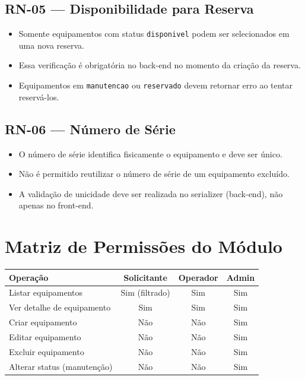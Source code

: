 \documentclass[12pt,a4paper]{article}
\begin{document}
\subsection{RN-05 — Disponibilidade para Reserva}
\begin{itemize}
  \item Somente equipamentos com status \texttt{disponivel} podem ser selecionados
        em uma nova reserva.
  \item Essa verificação é obrigatória no back-end no momento da criação da reserva.
  \item Equipamentos em \texttt{manutencao} ou \texttt{reservado} devem retornar erro
        ao tentar reservá-los.
\end{itemize}

\subsection{RN-06 — Número de Série}
\begin{itemize}
  \item O número de série identifica fisicamente o equipamento e deve ser único.
  \item Não é permitido reutilizar o número de série de um equipamento excluído.
  \item A validação de unicidade deve ser realizada no serializer (back-end),
        não apenas no front-end.
\end{itemize}

\section{Matriz de Permissões do Módulo}

\begin{center}
\begin{tabular}{@{}lccc@{}}
  \toprule
  \textbf{Operação}            & \textbf{Solicitante} & \textbf{Operador} & \textbf{Admin} \\
  \midrule
  Listar equipamentos          & Sim (filtrado)        & Sim               & Sim \\
  Ver detalhe de equipamento   & Sim                   & Sim               & Sim \\
  Criar equipamento            & Não                   & Não               & Sim \\
  Editar equipamento           & Não                   & Não               & Sim \\
  Excluir equipamento          & Não                   & Não               & Sim \\
  Alterar status (manutenção)  & Não                   & Não               & Sim \\
  \bottomrule
\end{tabular}
\end{center}
\end{document}
